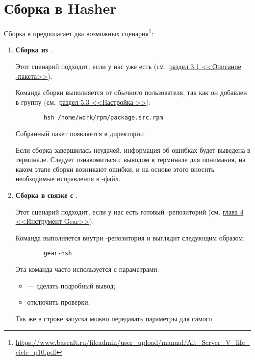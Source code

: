 \section{Сборка в Hasher}
Сборка в  предполагает два возможных сценария\footnote{\href{https://www.basealt.ru/fileadmin/user_upload/manual/Alt_Server_V_life_cicle_p10.pdf}{https://www.basealt.ru/fileadmin/user\_upload/manual/Alt\_Server\_V\_life\_cicle\_p10.pdf}}: 
\begin{enumerate}
	\item \textbf{Сборка из }.
	
	Этот сценарий подходит, если у нас уже есть  (см.~\hyperlink{3.1}{раздел 3.1 <<Описание -пакета>>}).
	
	Команда сборки выполняется от обычного пользователя, так как он добавлен в группу  (см.~\hyperlink{5.3}{раздел 5.3 <<Настройка >>}): 
	
	\begin{verbatim}
		hsh /home/work/rpm/package.src.rpm
	\end{verbatim}
	
	Собранный пакет появляется в директории . 
	
	Если сборка завершилась неудачей, информация об ошибках будет выведена в терминале. Следует ознакомиться с выводом в терминале для понимания, на каком этапе сборки возникают ошибки, и на основе этого вносить необходимые исправления в -файл.
	
	\item  \textbf{Сборка в связке с }.
	
	Этот сценарий подходит, если у нас есть готовый -репозиторий (см. \hyperlink{4}{глава 4 <<Инструмент Gear>>}).
	
	 Команда выполняется внутри -репозитория и выглядит следующим образом:
	 \begin{verbatim}
	 	gear-hsh
	 \end{verbatim}
	 
	 Эта команда часто используется с параметрами: 
	 \begin{itemize}
	 	\item {} --- сделать подробный вывод;
	 	\item {} отключить проверки.
	 \end{itemize}
	 Так же в строке запуска  можно передавать параметры для самого . 
\end{enumerate}

